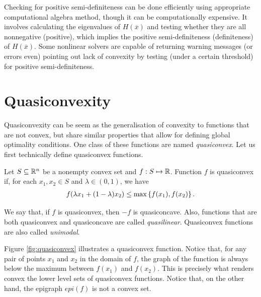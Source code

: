 Checking for positive semi-definiteness can be done efficiently using appropriate computational algebra method, though it can be computationally expensive. It involves calculating the eigenvalues of $H(\overline{x})$ and testing whether they are all nonnegative (positive), which implies the positive semi-definiteness (definiteness) of $H(\overline{x})$. Some nonlinear solvers are capable of returning warning messages (or errors even) pointing out lack of convexity by testing (under a certain threshold) for positive semi-definiteness.


\section{Quasiconvexity}

Quasiconvexity can be seem as the generalisation of convexity to functions that are not convex, but share similar properties that allow for defining global optimality conditions. One class of these functions are named \emph{quasiconvex}. Let us first technically define quasiconvex functions.
%
\begin{definition}
	Let $S \subseteq \mathbb{R}^n$ be a nonempty convex set and $f:S \mapsto \mathbb{R}$. Function $f$ is quasiconvex if, for each $x_1 ,x_2 \in S$ and $\lambda \in (0,1)$, we have
	\begin{align}
		f(\lambda x_1 + (1 - \lambda)x_2 ) \leq \max\left\{ f(x_1), f(x_2) \right \}. \label{eq:quasiconvexity}
	\end{align}
\end{definition}

We say that, if $f$ is quasiconvex, then $-f$ is quasiconcave. Also, functions that are both quasiconvex and quasiconcave are called \emph{quasilinear}. Quasiconvex functions are also called \emph{unimodal}.

Figure \ref{fig:quasiconvex} illustrates a quasiconvex function. Notice that, for any pair of points $x_1$ and $x_2$ in the domain of $f$, the graph of the function is always below the maximum between $f(x_1)$ and $f(x_2)$. This is precisely what renders convex the lower level sets of quasiconvex functions. Notice that, on the other hand, the epigraph $epi(f)$ is not a convex set. 

